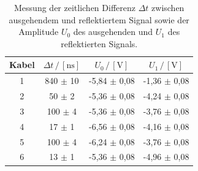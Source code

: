 \begin{table}[H]

    \centering
    \caption{Messung der zeitlichen Differenz $\Delta t$ zwischen ausgehendem und reflektiertem Signal sowie der Amplitude $U_0$ des ausgehenden und $U_1$ des reflektierten Signals.}
    \begin{tabular}{cccc}
    \toprule
    Kabel & $\Delta t \,/\, [\unit{\nano\second}]$ & $U_0 \,/\, [\unit{\volt}]$ & $U_1 \,/\, [\unit{\volt}]$\\
    \midrule
    1 &  840 $\pm$ 10 & -5,84  $\pm$ 0,08 &-1,36 $\pm$  0,08 \\
    2 &  50  $\pm$ 2  & -5,36  $\pm$ 0,08 &-4,24 $\pm$  0,08 \\
    3 &  100 $\pm$ 4  & -5,36  $\pm$ 0,08 &-3,76 $\pm$  0,08 \\
    4 &  17  $\pm$ 1  & -6,56  $\pm$ 0,08 &-4,16 $\pm$  0,08 \\
    5 &  100 $\pm$ 4  & -6,24  $\pm$ 0,08 &-3,76 $\pm$  0,08 \\
    6 &  13  $\pm$ 1  & -5,36  $\pm$ 0,08 &-4,96 $\pm$  0,08 \\
    \bottomrule
    \end{tabular}
    \label{tab:messlendaem}
\end{table}